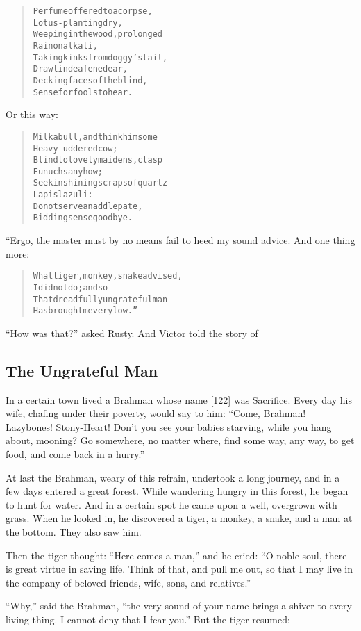 \documentclass[article, twoside, 14pt]{memoir}
\renewenvironment{verbatim}{%
\begin{quote}%
\vskip -10pt%
\begin{alltt}\normalfont\large}{\end{alltt}%
\end{quote}%
\vskip -10pt
} %
\begin{document}
\begin{verbatim}
Perfume offered to a corpse,
    Lotus-planting dry,
Weeping in the wood, prolonged
    Rain on alkali,
Taking kinks from doggy's tail,
    Drawl in deafened ear,
Decking faces of the blind,
    Sense for fools to hear.
\end{verbatim}
Or this way:

\begin{verbatim}
Milk a bull, and think him some
    Heavy-uddered cow;
Blind to lovely maidens, clasp
    Eunuchs anyhow;
Seek in shining scraps of quartz
    Lapis lazuli:
Do not serve an addlepate,
    Bidding sense goodbye.
\end{verbatim}
“Ergo, the master must by no means fail to heed my sound advice.
And one thing more:

\begin{verbatim}
What tiger, monkey, snake advised,
    I did not do; and so
That dreadfully ungrateful man
    Has brought me very low.”
\end{verbatim}
``How was that?'' asked Rusty. And Victor told the story of

\subsection{The Ungrateful Man}

\label{s12}

In a certain town lived a Brahman whose name [122] was Sacrifice.
Every day his wife, chafing under their poverty, would say to him:
``Come, Brahman! Lazybones! Stony-Heart! Don't you see your babies starving, while you hang about, mooning? Go somewhere, no matter where, find some way, any way, to get food, and come back in a hurry.''

At last the Brahman, weary of this refrain, undertook a long
journey, and in a few days entered a great forest. While wandering
hungry in this forest, he began to hunt for water. And in a certain
spot he came upon a well, overgrown with grass. When he looked in,
he discovered a tiger, a monkey, a snake, and a man at the bottom.
They also saw him.

Then the tiger thought: ``Here comes a man,'' and he cried:
``O noble soul, there is great virtue in saving life. Think of that, and pull me out, so that I may live in the company of beloved friends, wife, sons, and relatives.''

``Why,'' said the Brahman,
``the very sound of your name brings a shiver to every living thing. I cannot deny that I fear you.''
But the tiger resumed:
\end{document}
